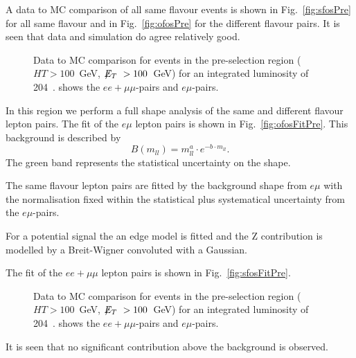 A data to MC comparison of all same flavour events
is shown in Fig.~\ref{fig:sfosPre} for all same flavour
and in Fig.~\ref{fig:ofosPre} for the different flavour
pairs. It is seen that data and simulation do agree relatively good.

\begin{figure}[hbtp]
  \hfill
  \hfill
  \caption{Data to MC comparison for events in the pre-selection region ($HT>100$~GeV, $\displaystyle{\not} E_T~> 100$~GeV)
  for an integrated luminosity of 204~\pbi.  shows the $ee+\mu\mu$-pairs and
  $e\mu$-pairs.}
\end{figure}

In this region we perform a full shape analysis
of the same and different flavour lepton pairs.
The fit of the $e\mu$ lepton pairs is shown
in Fig.~\ref{fig:ofosFitPre}.
This background is described by 
\begin{equation}\label{eq:fit_bkg}
B(m_{ll}) = m_{ll}^{a} \cdot e^{-b\cdot m_{ll}}.
\end{equation}
The green band represents the statistical 
uncertainty on the shape.

The same flavour lepton pairs are fitted
by the background shape from $e\mu$
with the normalisation fixed within the 
statistical plus systematical uncertainty
from the $e\mu$-pairs.

For a potential signal the an edge model
is fitted and the Z contribution
is modelled by a Breit-Wigner convoluted 
with a Gaussian.

The fit of the $ee+\mu\mu$ lepton pairs is shown
in Fig.~\ref{fig:sfosFitPre}.

\begin{figure}[hbtp]
  \hfill
  \hfill
  \caption{Data to MC comparison for events in the pre-selection region ($HT>100$~GeV, $\displaystyle{\not} E_T~> 100$~GeV)
  for an integrated luminosity of 204~\pbi.  shows the $ee+\mu\mu$-pairs and
  $e\mu$-pairs.}
\end{figure}

It is seen that no significant contribution
above the background is observed.

